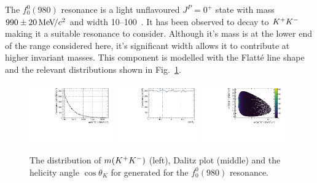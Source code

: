 The $f_{0}^{0}(980)$ resonance is a light unflavoured $J^{P} = 0^{+}$ state with mass $990\pm20{\mathrm{\,Me\kern -0.1em V\!/}c^2}$ and width 10--100\mevcc~\cite{PDG2016}. It has been observed to decay to ${{K}^+}{{K}^-}$ making it a suitable resonance to consider. Although it's mass is at the lower end of the range considered here, it's significant width allows it to contribute at higher invariant masses. This component is modelled with the Flatt\'{e} line shape~\cite{Flatte:1976xu} and the relevant distributions shown in Fig.~\ref{fig:DsKK_model_f0980}.
\begin{figure}[!h]
   \centering   
   \includegraphics[width=0.32\textwidth]{figs/B2DsPhi/f0_phi_mass.pdf}
   \includegraphics[width=0.32\textwidth]{figs/B2DsPhi/f0_Helicity.pdf}
   \includegraphics[width=0.32\textwidth]{figs/B2DsPhi/f0_Dalitz_plot.pdf}
   \caption{The distribution of $m({{K}^+}{{K}^-})$ (left), Dalitz plot (middle) and the helicity angle $\cos\theta_{K}$ for generated for the $f_{0}^{0}(980)$ resonance.} 
   \label{fig:DsKK_model_f0980}   
\end{figure}

